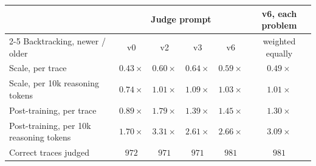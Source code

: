\begin{tabular}{lccccc}
\toprule
 & \multicolumn{4}{c}{Judge prompt} & v6, each problem \\
\cmidrule{2-5}
Backtracking, newer / older & v0 & v2 & v3 & v6 & weighted equally \\
\midrule
Scale, per trace & $0.43\times$ & $0.60\times$ & $0.64\times$ & $0.59\times$ & $0.49\times$ \\
Scale, per 10k reasoning tokens & $0.74\times$ & $1.01\times$ & $1.09\times$ & $1.03\times$ & $1.01\times$ \\
Post-training, per trace & $0.89\times$ & $1.79\times$ & $1.39\times$ & $1.45\times$ & $1.30\times$ \\
Post-training, per 10k reasoning tokens & $1.70\times$ & $3.31\times$ & $2.61\times$ & $2.66\times$ & $3.09\times$ \\
\addlinespace
Correct traces judged & $972$ & $971$ & $971$ & $981$ & $981$ \\
\bottomrule
\end{tabular}
